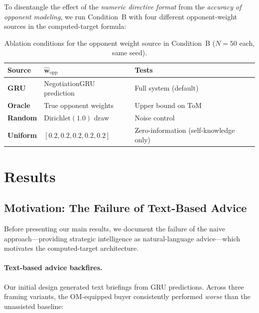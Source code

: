 \documentclass[11pt,a4paper]{article}
\begin{document}
To disentangle the effect of the \emph{numeric directive format} from the \emph{accuracy of opponent modeling}, we run Condition~B with four different opponent-weight sources in the computed-target formula:

\begin{table}[h]
\centering
\caption{Ablation conditions for the opponent weight source in Condition~B ($N = 50$ each, same seed).}
\label{tab:ablation_design}
\begin{tabular}{lll}
\toprule
Source & $\hat{\mathbf{w}}_{\text{opp}}$ & Tests \\
\midrule
\textbf{GRU} & NegotiationGRU prediction & Full system (default) \\
\textbf{Oracle} & True opponent weights & Upper bound on ToM \\
\textbf{Random} & $\text{Dirichlet}(1.0)$ draw & Noise control \\
\textbf{Uniform} & $[0.2, 0.2, 0.2, 0.2, 0.2]$ & Zero-information (self-knowledge only) \\
\bottomrule
\end{tabular}
\end{table}

\section{Results}
\label{sec:results}

\subsection{Motivation: The Failure of Text-Based Advice}
\label{sec:pivot}

Before presenting our main results, we document the failure of the naive approach---providing strategic intelligence as natural-language advice---which motivates the computed-target architecture.

\paragraph{Text-based advice backfires.}
\label{sec:text_fail}
Our initial design generated text briefings from GRU predictions. Across three framing variants, the OM-equipped buyer consistently performed \emph{worse} than the unassisted baseline:
\end{document}
